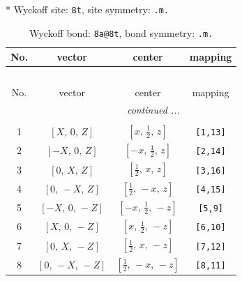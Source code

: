 \documentclass[fleqn,8pt]{jsarticle}
\begin{document}
* Wyckoff site: {\tt 8t}, site symmetry: {\tt .m.}
\renewcommand{\arraystretch}{1.2}
\begin{longtable}{cccc}
\caption{Wyckoff bond: {\tt 8a@8t}, bond symmetry: {\tt .m.}}
 \\
 \hline \hline
No. & vector & center & mapping \\ \hline \endfirsthead

\multicolumn{3}{l}{\tablename\ \thetable{}} \\
 \hline \hline
No. & vector & center & mapping \\ \hline \endhead

 \hline \hline
\multicolumn{3}{r}{\footnotesize\it continued ...} \\ \endfoot

 \hline \hline
\multicolumn{3}{r}{} \\ \endlastfoot

1 & $\left[ X,\, 0,\, Z \right]$ & $\left[ x,\, \frac{1}{2},\, z \right]$ & {\tt [1,13]} \\ \hline
2 & $\left[ - X,\, 0,\, Z \right]$ & $\left[ - x,\, \frac{1}{2},\, z \right]$ & {\tt [2,14]} \\ \hline
3 & $\left[ 0,\, X,\, Z \right]$ & $\left[ \frac{1}{2},\, x,\, z \right]$ & {\tt [3,16]} \\ \hline
4 & $\left[ 0,\, - X,\, Z \right]$ & $\left[ \frac{1}{2},\, - x,\, z \right]$ & {\tt [4,15]} \\ \hline
5 & $\left[ - X,\, 0,\, - Z \right]$ & $\left[ - x,\, \frac{1}{2},\, - z \right]$ & {\tt [5,9]} \\ \hline
6 & $\left[ X,\, 0,\, - Z \right]$ & $\left[ x,\, \frac{1}{2},\, - z \right]$ & {\tt [6,10]} \\ \hline
7 & $\left[ 0,\, X,\, - Z \right]$ & $\left[ \frac{1}{2},\, x,\, - z \right]$ & {\tt [7,12]} \\ \hline
8 & $\left[ 0,\, - X,\, - Z \right]$ & $\left[ \frac{1}{2},\, - x,\, - z \right]$ & {\tt [8,11]} \\
\end{longtable}
\renewcommand{\arraystretch}{1.2}
\end{document}
